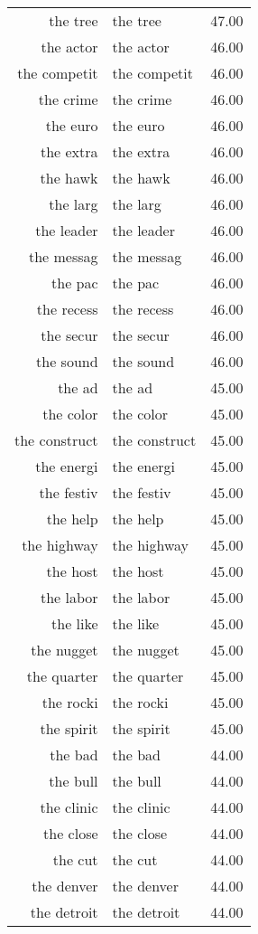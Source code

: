 \begin{table}[ht]
\begin{tabular}{rlr}
  the tree & the tree & 47.00 \\ 
  the actor & the actor & 46.00 \\ 
  the competit & the competit & 46.00 \\ 
  the crime & the crime & 46.00 \\ 
  the euro & the euro & 46.00 \\ 
  the extra & the extra & 46.00 \\ 
  the hawk & the hawk & 46.00 \\ 
  the larg & the larg & 46.00 \\ 
  the leader & the leader & 46.00 \\ 
  the messag & the messag & 46.00 \\ 
  the pac & the pac & 46.00 \\ 
  the recess & the recess & 46.00 \\ 
  the secur & the secur & 46.00 \\ 
  the sound & the sound & 46.00 \\ 
  the ad & the ad & 45.00 \\ 
  the color & the color & 45.00 \\ 
  the construct & the construct & 45.00 \\ 
  the energi & the energi & 45.00 \\ 
  the festiv & the festiv & 45.00 \\ 
  the help & the help & 45.00 \\ 
  the highway & the highway & 45.00 \\ 
  the host & the host & 45.00 \\ 
  the labor & the labor & 45.00 \\ 
  the like & the like & 45.00 \\ 
  the nugget & the nugget & 45.00 \\ 
  the quarter & the quarter & 45.00 \\ 
  the rocki & the rocki & 45.00 \\ 
  the spirit & the spirit & 45.00 \\ 
  the bad & the bad & 44.00 \\ 
  the bull & the bull & 44.00 \\ 
  the clinic & the clinic & 44.00 \\ 
  the close & the close & 44.00 \\ 
  the cut & the cut & 44.00 \\ 
  the denver & the denver & 44.00 \\ 
  the detroit & the detroit & 44.00 \\ 

\end{tabular}
\end{table}
